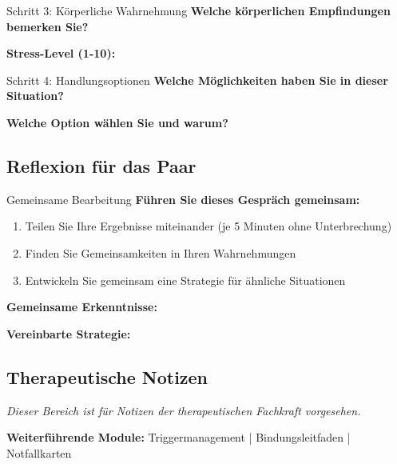 \vspace{1cm}

\begin{ctmmPurpleBox}{Schritt 3: Körperliche Wahrnehmung}
\textbf{Welche körperlichen Empfindungen bemerken Sie?}


\vspace{0.5cm}
\textbf{Stress-Level (1-10):}
\end{ctmmPurpleBox}

\vspace{1cm}

\begin{ctmmOrangeBox}{Schritt 4: Handlungsoptionen}
\textbf{Welche Möglichkeiten haben Sie in dieser Situation?}


\vspace{0.5cm}
\textbf{Welche Option wählen Sie und warum?}
\end{ctmmOrangeBox}

\subsection{Reflexion für das Paar}

\begin{ctmmGreenBox}{Gemeinsame Bearbeitung}
\textbf{Führen Sie dieses Gespräch gemeinsam:}

\begin{enumerate}
    \item Teilen Sie Ihre Ergebnisse miteinander (je 5 Minuten ohne Unterbrechung)
    \item Finden Sie Gemeinsamkeiten in Ihren Wahrnehmungen
    \item Entwickeln Sie gemeinsam eine Strategie für ähnliche Situationen
\end{enumerate}

\textbf{Gemeinsame Erkenntnisse:}

\textbf{Vereinbarte Strategie:}
\end{ctmmGreenBox}

\subsection{Therapeutische Notizen}
\textit{Dieser Bereich ist für Notizen der therapeutischen Fachkraft vorgesehen.}


\vspace{1cm}
\begin{center}
\faCompass{} \textcolor{ctmmBlue}{\textbf{Weiterführende Module:}} 
\textcolor{ctmmGray}{Triggermanagement | Bindungsleitfaden | Notfallkarten}
\end{center}